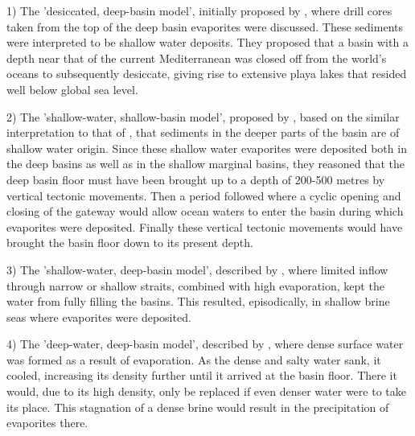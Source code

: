 \documentclass[twocolumn]{article}
\begin{document}
1) The 'desiccated, deep-basin model', initially proposed by \cite{hsu1972origin}, where drill cores taken from the top of the deep basin evaporites were discussed. These sediments were interpreted to be shallow water deposits. They proposed that a basin with a depth near that of the current Mediterranean was closed off from the world's oceans to subsequently desiccate, giving rise to extensive playa lakes that resided well below global sea level. 

2) The 'shallow-water, shallow-basin model', proposed by \cite{nesteroff1973mineralogy}, based on the similar interpretation to that of \cite{hsu1972origin}, that sediments in the deeper parts of the basin are of shallow water origin. Since these shallow water evaporites were deposited both in the deep basins as well as in the shallow marginal basins, they reasoned that the deep basin floor must have been brought up to a depth of 200-500 metres by vertical tectonic movements. Then a period followed where a cyclic opening and closing of the gateway would allow ocean waters to enter the basin during which evaporites were deposited. Finally these vertical tectonic movements would have brought the basin floor down to its present depth.

3) The 'shallow-water, deep-basin model', described by \cite{rouchy2006messinian}, where limited inflow through narrow or shallow straits, combined with high evaporation, kept the water from fully filling the basins. This resulted, episodically, in shallow brine seas where evaporites were deposited. 

4) The 'deep-water, deep-basin model', described by \cite{schmalz1969deep}, where dense surface water was formed as a result of evaporation. As the dense and salty water sank, it cooled, increasing its density further until it arrived at the basin floor. There it would, due to its high density, only be replaced if even denser water were to take its place. This stagnation of a dense brine would result in the precipitation of evaporites there.\\
\end{document}
